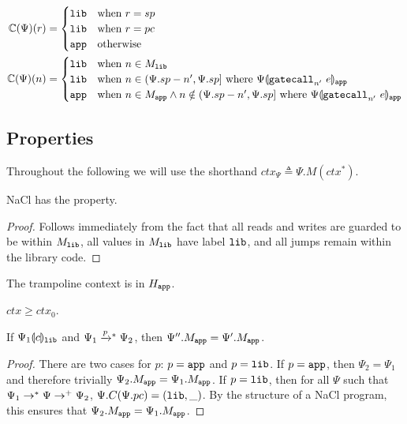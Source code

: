 \begin{enumerate}
  \begin{align*}
    \mathbb{C}(\Psi)(r) &=
      \begin{cases}
        \mathtt{lib} & \text{when } r = sp \\
        \mathtt{lib} & \text{when } r = pc \\
        \mathtt{app} & \text{otherwise}
      \end{cases} \\
    \mathbb{C}(\Psi)(n) &=
      \begin{cases}
        \mathtt{lib} & \text{when } n \in M_{\mathtt{lib}} \\
        \mathtt{lib} & \text{when } n \in (\Psi.sp - n', \Psi.sp] \text{ where } {\Psi}\llparenthesis{\ensuremath{\mathtt{gatecall}_{\mathit{n'}}\ {e}}}\rrparenthesis_{\mathtt{app}} \\
        \mathtt{app} & \text{when } n \in M_{\mathtt{app}} \wedge n \notin (\Psi.sp - n', \Psi.sp] \text{ where } {\Psi}\llparenthesis{\ensuremath{\mathtt{gatecall}_{\mathit{n'}}\ {e}}}\rrparenthesis_{\mathtt{app}}
      \end{cases}
  \end{align*}
\end{enumerate}

\subsection{Properties}

Throughout the following we will use the shorthand $ctx_{\Psi} \triangleq \Psi.M(ctx^{\ast})$.

\begin{proposition}
  NaCl has the \strongni{} property.
\end{proposition}
\begin{proof}
  Follows immediately from the fact that all reads and writes are guarded to be within $M_{\mathtt{lib}}$, all values in $M_{\mathtt{lib}}$ have label $\mathtt{lib}$, and all jumps remain within the library code.
\end{proof}

\begin{lemma} \label{lemma:appendix:nacl:context-in-trusted}
  The trampoline context is in $H_{\mathtt{app}}$.
\end{lemma}

\begin{lemma} \label{lemma:appendix:nacl:ctx-positive}
  $ctx \geq ctx_0$.
\end{lemma}

\begin{lemma} \label{lemma:appendix:nacl:lib-p-steps-preserve-app-memory}
  If ${\Psi_1}\llparenthesis{c}\rrparenthesis_{\mathtt{lib}}$ and $\Psi_1 \steppstar{p} \Psi_2$, then $\Psi''.M_{\mathtt{app}} = \Psi'.M_{\mathtt{app}}$.
\end{lemma}
\begin{proof}
  There are two cases for $p$: $p = \mathtt{app}$ and $p = \mathtt{lib}$.
  If $p = \mathtt{app}$, then $\Psi_2 = \Psi_1$ and therefore trivially $\Psi_2.M_{\mathtt{app}} = \Psi_1.M_{\mathtt{app}}$.
  If $p = \mathtt{lib}$, then for all $\Psi$ such that $\Psi_1 \mathrel{\mathrel{\rightarrow}^{\ast}} \Psi \mathrel{\mathrel{\rightarrow}^{+}} \Psi_2$, $\Psi.C(\Psi.pc) = (\mathtt{lib}, \_)$.
  By the structure of a NaCl program, this ensures that $\Psi_2.M_{\mathtt{app}} = \Psi_1.M_{\mathtt{app}}$.
\end{proof}

